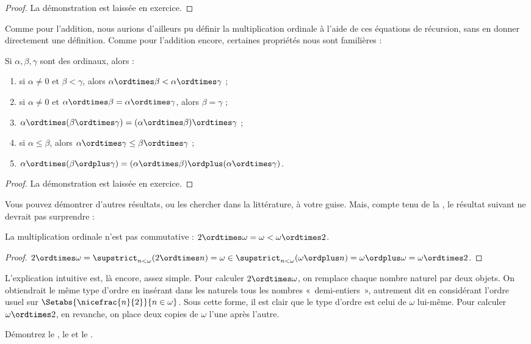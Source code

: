 \documentclass[../../../include/open-logic-section]{subfiles}
\begin{document}
\begin{proof}
La démonstration est laissée en exercice.
\end{proof}

Comme pour l'addition, nous aurions d'ailleurs pu
définir la multiplication ordinale à l'aide de ces
équations de récursion, sans en donner directement
une définition. Comme pour l'addition encore,
certaines propriétés nous sont familières :

\begin{lem}
Si $\alpha, \beta, \gamma$ sont des ordinaux, alors :
\begin{enumerate}
	\item{}
	si $\alpha \neq 0$ et $\beta < \gamma$,
	alors $\alpha \ordtimes \beta <
	\alpha \ordtimes \gamma$ ;
	\item{}
	si $\alpha \neq 0$ et
	$\alpha \ordtimes \beta =
	\alpha\ordtimes\gamma$, alors $\beta = \gamma$ ;
	\item{}
	$\alpha \ordtimes (\beta \ordtimes \gamma)
	= (\alpha \ordtimes \beta) \ordtimes \gamma$ ;
	\item{}
	si $\alpha \leq \beta$, alors
	$\alpha \ordtimes \gamma
	\leq \beta \ordtimes \gamma$ ;
	\item{}
	$\alpha \ordtimes (\beta \ordplus \gamma)
	= (\alpha \ordtimes \beta)
	\ordplus (\alpha\ordtimes \gamma)$.
\end{enumerate}
\end{lem}

\begin{proof}
La démonstration est laissée en exercice.
\end{proof}

Vous pouvez démontrer d'autres résultats, ou les
chercher dans la littérature, à votre guise.
Mais, compte tenu de la
,
le résultat suivant ne devrait pas surprendre :

\begin{prop}
La multiplication ordinale n'est pas commutative :
$2 \ordtimes \omega = \omega <
\omega \ordtimes 2$.
\end{prop}

\begin{proof}
$2 \ordtimes \omega =
\supstrict_{n < \omega}(2\ordtimes n)
= \omega \in
\supstrict_{n < \omega}(\omega \ordplus n)
= \omega \ordplus \omega
= \omega \ordtimes 2$.
\end{proof}
\noindent
L'explication intuitive est, là encore, assez simple.
Pour calculer $2 \ordtimes \omega$, on remplace
chaque nombre naturel par deux objets. On obtiendrait
le même type d'ordre en insérant dans les naturels
tous les nombres «~demi-entiers~», autrement dit
en considérant l'ordre usuel sur
$\Setabs{\nicefrac{n}{2}}{n \in \omega}$.
Sous cette forme, il est clair que le type d'ordre
est celui de $\omega$ lui-même. Pour calculer
$\omega \ordtimes 2$, en revanche, on place deux
copies de $\omega$ l'une après l'autre.

\begin{prob}
Démontrez le
,
le 
et le
.
\end{prob}
\end{document}
